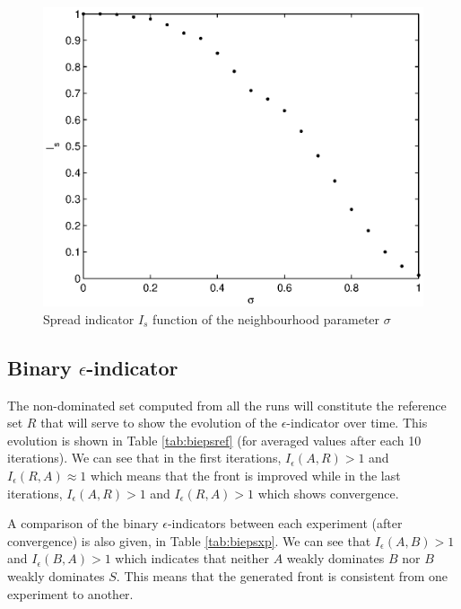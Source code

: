 \begin{figure}[h!]
\begin{center}
\includegraphics[width=1\linewidth]{spread_indicator_norm2.eps}
\end{center}
\vspace{-0.5cm}
\caption{Spread indicator $I_s$ function of the neighbourhood parameter $\sigma$}
\label{fig:spread_indicator}
\end{figure}

\subsection{Binary $\epsilon$-indicator}
The non-dominated set computed from all the runs will constitute the reference set $R$ that will serve to show the evolution of the $\epsilon$-indicator over time. This evolution is shown in Table \ref{tab:biepsref} (for averaged values after each 10 iterations). We can see that in the first iterations, $I_\epsilon(A,R) > 1$ and $I_\epsilon(R,A) \approx 1$ which means that the front is improved while in the last iterations, $I_\epsilon(A,R) > 1$ and $I_\epsilon(R,A) > 1$ which shows convergence.

A comparison of the binary $\epsilon$-indicators between each experiment (after convergence) is also given, in Table \ref{tab:biepsxp}. We can see that $I_\epsilon(A,B) > 1$ and $I_\epsilon(B,A) > 1$ which indicates that neither $A$ weakly dominates $B$ nor $B$ weakly dominates $S$. This means that the generated front is consistent from one experiment to another.

